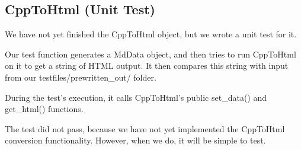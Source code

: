 \subsection{CppToHtml (Unit Test)}

We have not yet finished the CppToHtml object, but we wrote a unit test for it.

Our test function generates a MdData object, and then tries to run CppToHtml on it to get a string of HTML output. It then compares this string with input from our testfiles/prewritten_out/ folder. 

During the test's execution, it calls CppToHtml's public set_data() and get_html() functions.

The test did not pass, because we have not yet implemented the CppToHtml conversion functionality. However, when we do, it will be simple to test.
